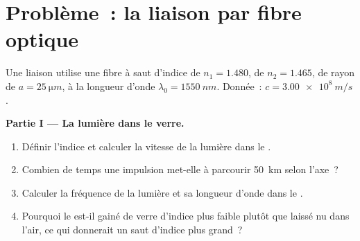 \section{Problème~: la liaison par fibre optique}

\begin{problem}
\label{pb:b1:rays-reflection-refraction:1}
Une liaison utilise une fibre à saut d'indice de  $n_1 = 1.480$, de
 $n_2 = 1.465$, de rayon de  $a = \qty{25}{\micro m}$, à la
longueur d'onde $\lambda_0 = \qty{1550}{nm}$. Donnée~: $c = \qty{3.00e8}{m/s}$.

\medskip
\noindent\textbf{Partie I --- La lumière dans le verre.}
\begin{enumerate}
  \item Définir l'indice et calculer la vitesse de la lumière dans le
        .
  \item Combien de temps une impulsion met-elle à parcourir \qty{50}{km}
        selon l'axe~?
  \item Calculer la fréquence de la lumière et sa longueur d'onde dans
        le .
  \item Pourquoi le  est-il gainé de verre d'indice plus faible
        plutôt que laissé nu dans l'air, ce qui donnerait un saut
        d'indice plus grand~?
\end{enumerate}


\end{problem}
